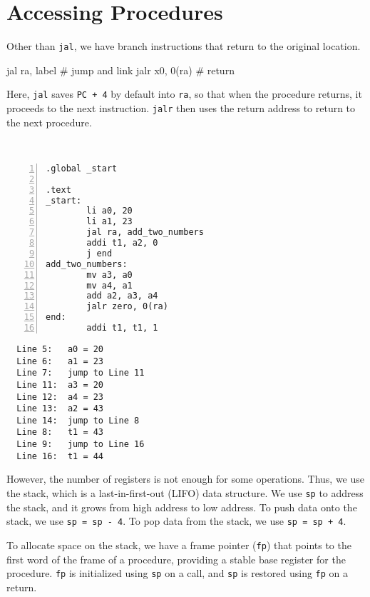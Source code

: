 \newpage
\section{Accessing Procedures}
Other than \verb|jal|, we have branch instructions that return to the original location.
\begin{codeBlock}
  jal ra, label   # jump and link
  jalr x0, 0(ra)  # return
\end{codeBlock}

Here, \verb|jal| saves \verb|PC + 4| by default into \verb|ra|, so that when the procedure returns, it proceeds to the next instruction. \verb|jalr| then uses the return address to return to the next procedure.

\begin{eg}~

\begin{minipage}{0.5\textwidth}
\begin{Verbatim}[numbers=left,xleftmargin=5mm]
.global _start

.text
_start:
        li a0, 20
        li a1, 23
        jal ra, add_two_numbers 
        addi t1, a2, 0
        j end 
add_two_numbers:
        mv a3, a0
        mv a4, a1
        add a2, a3, a4
        jalr zero, 0(ra)
end:    
        addi t1, t1, 1
\end{Verbatim}
\end{minipage}
\begin{minipage}{0.5\textwidth}
\color{red}
\begin{verbatim}
  Line 5:   a0 = 20
  Line 6:   a1 = 23
  Line 7:   jump to Line 11
  Line 11:  a3 = 20
  Line 12:  a4 = 23
  Line 13:  a2 = 43
  Line 14:  jump to Line 8
  Line 8:   t1 = 43
  Line 9:   jump to Line 16
  Line 16:  t1 = 44
\end{verbatim}
\end{minipage}
\end{eg}

However, the number of registers is not enough for some operations. Thus, we use the stack, which is a last-in-first-out (LIFO) data structure. We use \verb|sp| to address the stack, and it grows from high address to low address. To push data onto the stack, we use \verb|sp = sp - 4|. To pop data from the stack, we use \verb|sp = sp + 4|. 

To allocate space on the stack, we have a frame pointer (\verb|fp|) that points to the first word of the frame of a procedure, providing a stable base register for the procedure. \verb|fp| is initialized using \verb|sp| on a call, and \verb|sp| is restored using \verb|fp| on a return.

